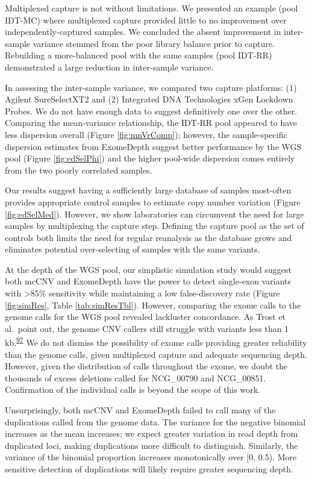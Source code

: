 \documentclass[11pt,letterpaper]{book}
\begin{document}
Multiplexed capture is not without limitations.
We presented an example (pool IDT-MC) where multiplexed capture provided little to no improvement over independently-captured samples.
We concluded the absent improvement in inter-sample variance stemmed from the poor library balance prior to capture.
Rebuilding a more-balanced pool with the same samples (pool IDT-RR) demonstrated a large reduction in inter-sample variance.

In assessing the inter-sample variance, we compared two capture platforms: (1) Agilent SureSelectXT2 and (2) Integrated DNA Technologies xGen Lockdown Probes.
We do not have enough data to suggest definitively one over the other.
Comparing the mean-variance relationship, the IDT-RR pool appeared to have less dispersion overall (Figure \ref{fig:mnVrComp}); however, the sample-specific dispersion estimates from ExomeDepth suggest better performance by the WGS pool (Figure \ref{fig:edSelPhi}) and the higher pool-wide dispersion comes entirely from the two poorly correlated samples.

Our results suggest having a sufficiently large database of samples most-often provides appropriate control samples to estimate copy number variation (Figure \ref{fig:edSelMed}).
However, we show laboratories can circumvent the need for large samples by multiplexing the capture step.
Defining the capture pool as the set of controls both limits the need for regular reanalysis as the database grows and eliminates potential over-selecting of samples with the same variants.

At the depth of the WGS pool, our simplistic simulation study would suggest both mcCNV and ExomeDepth have the power to detect single-exon variants with \textgreater85\% sensitivity while maintaining a low false-discovery rate (Figure \ref{fig:simRes}, Table \ref{tab:simResTbl}).
However, comparing the exome calls to the genome calls for the WGS pool revealed lackluster concordance.
As Trost et al.~point out, the genome CNV callers still struggle with variants less than 1 kb.\textsuperscript{\protect\hyperlink{ref-trost:2018aa}{97}}
We do not dismiss the possibility of exome calls providing greater reliability than the genome calls, given multiplexed capture and adequate sequencing depth.
However, given the distribution of calls throughout the exome, we doubt the thousands of excess deletions called for NCG\_00790 and NCG\_00851.
Confirmation of the individual calls is beyond the scope of this work.

Unsurprisingly, both mcCNV and ExomeDepth failed to call many of the duplications called from the genome data.
The variance for the negative binomial increases as the mean increases; we expect greater variation in read depth from duplicated loci, making duplications more difficult to distinguish.
Similarly, the variance of the binomial proportion increases monotonically over {[}0, 0.5).
More sensitive detection of duplications will likely require greater sequencing depth.
\end{document}
